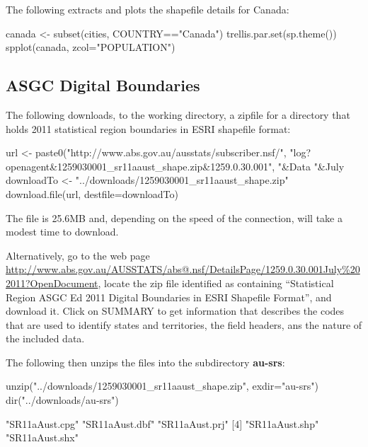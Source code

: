 \documentclass{tufte-book}\usepackage[]{graphicx}\usepackage[]{color}
\begin{document}
{The following extracts and plots the shapefile details for Canada:
\begin{Schunk}
\begin{Sinput}
canada <- subset(cities, COUNTRY=="Canada")
trellis.par.set(sp.theme())
spplot(canada, zcol="POPULATION")
\end{Sinput}
\end{Schunk}

\subsection*{ASGC Digital Boundaries}

The following downloads, to the working directory, a zipfile for
a directory that holds 2011 statistical region boundaries in ESRI
shapefile format:
\begin{Schunk}
\begin{Sinput}
url <- paste0("http://www.abs.gov.au/ausstats/subscriber.nsf/",
  "log?openagent&1259030001_sr11aaust_shape.zip&1259.0.30.001",
  "&Data%
  "&July%
downloadTo <- "../downloads/1259030001_sr11aaust_shape.zip"
download.file(url, destfile=downloadTo)
\end{Sinput}
\end{Schunk}
\noindent
The file is 25.6MB and, depending on the speed of the connection,
will take a modest time to download.

Alternatively, go to the web page
  \url{http://www.abs.gov.au/AUSSTATS/abs@.nsf/DetailsPage/1259.0.30.001July%202011?OpenDocument},
    locate the zip file identified as containing ``Statistical
    Region ASGC Ed 2011 Digital Boundaries in ESRI Shapefile Format'',
    and download it.  Click on SUMMARY to get information that
    describes the codes that are used to identify states and
    territories, the field headers, ans the nature of the included
    data.

The following then unzips the files into the
subdirectory {\bf au-srs}:
\begin{Schunk}
\begin{Sinput}
unzip("../downloads/1259030001_sr11aaust_shape.zip", exdir="au-srs")
dir("../downloads/au-srs")
\end{Sinput}
\begin{Soutput}
[1] "SR11aAust.cpg" "SR11aAust.dbf" "SR11aAust.prj"
[4] "SR11aAust.shp" "SR11aAust.shx"
\end{Soutput}
\end{Schunk}

}
\end{document}
